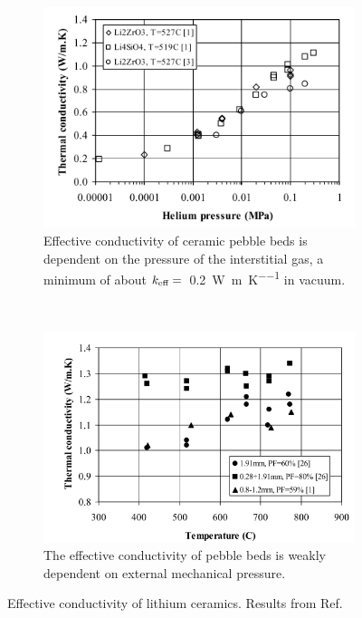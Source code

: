 \begin{figure}[ht]
        \centering
        \begin{subfigure}[t]{\doubleimagewidth}
                \includegraphics[width=\textwidth]{figures/keff-pressure}
                \caption{Effective conductivity of ceramic pebble beds is dependent on the pressure of the interstitial gas, a minimum of about $k_\text{eff} = $~\SI{0.2}{\watt\per\meter\per\kelvin} in vacuum.}
                \label{fig:keff-pressure}
        \end{subfigure}%
        ~
        \begin{subfigure}[t]{\doubleimagewidth  }
                \includegraphics[width=\textwidth]{figures/lit-keff-exp}
                \caption{The effective conductivity of pebble beds is weakly dependent on external mechanical pressure.}
                \label{fig:keff-lit}
        \end{subfigure}
        \caption{Effective conductivity of lithium ceramics. Results from Ref.~\cite{Abou-Sena2005}}\label{fig:keff}
\end{figure}

